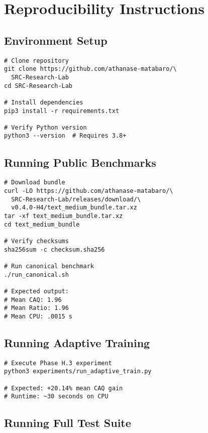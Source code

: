 \documentclass[11pt,twocolumn]{article}
\begin{document}
\appendix

\section{Reproducibility Instructions}

\subsection{Environment Setup}

\begin{verbatim}
# Clone repository
git clone https://github.com/athanase-matabaro/\
  SRC-Research-Lab
cd SRC-Research-Lab

# Install dependencies
pip3 install -r requirements.txt

# Verify Python version
python3 --version  # Requires 3.8+
\end{verbatim}

\subsection{Running Public Benchmarks}

\begin{verbatim}
# Download bundle
curl -LO https://github.com/athanase-matabaro/\
  SRC-Research-Lab/releases/download/\
  v0.4.0-H4/text_medium_bundle.tar.xz
tar -xf text_medium_bundle.tar.xz
cd text_medium_bundle

# Verify checksums
sha256sum -c checksum.sha256

# Run canonical benchmark
./run_canonical.sh

# Expected output:
# Mean CAQ: 1.96
# Mean Ratio: 1.96
# Mean CPU: .0015 s
\end{verbatim}

\subsection{Running Adaptive Training}

\begin{verbatim}
# Execute Phase H.3 experiment
python3 experiments/run_adaptive_train.py

# Expected: +20.14% mean CAQ gain
# Runtime: ~30 seconds on CPU
\end{verbatim}

\subsection{Running Full Test Suite}
\end{document}
